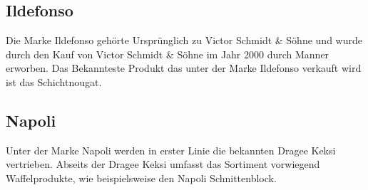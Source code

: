 \subsection{Ildefonso}
\noindent
Die Marke Ildefonso gehörte Ursprünglich zu Victor Schmidt \& Söhne und wurde durch den Kauf von Victor Schmidt \& Söhne im Jahr 2000 durch Manner erworben. Das Bekannteste Produkt das unter der Marke Ildefonso verkauft wird ist das Schichtnougat.\cite{josef_manner_marken}
\newpage

\subsection{Napoli}
\noindent
Unter der Marke Napoli werden in erster Linie die bekannten Dragee Keksi vertrieben. Abseits der Dragee Keksi umfasst das Sortiment vorwiegend Waffelprodukte, wie beispielsweise den Napoli Schnittenblock.\cite{josef_manner_marken}
